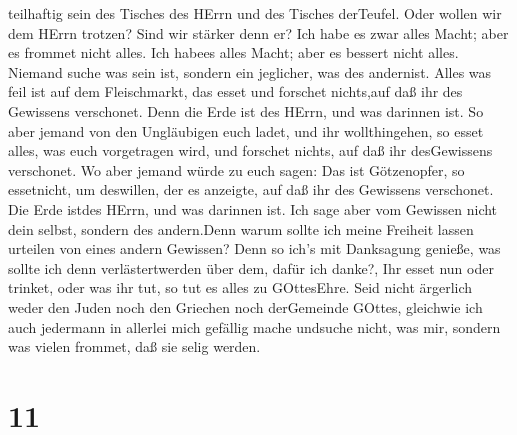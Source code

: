 teilhaftig sein des Tisches des HErrn und des Tisches derTeufel.
 Oder wollen wir dem HErrn trotzen? Sind wir stärker denn
er?  Ich habe es zwar alles Macht; aber es frommet nicht
alles. Ich habees alles Macht; aber es bessert nicht alles.
 Niemand suche was sein ist, sondern ein jeglicher, was des
andernist.  Alles was feil ist auf dem Fleischmarkt, das
esset und forschet nichts,auf daß ihr des Gewissens verschonet.
 Denn die Erde ist des HErrn, und was darinnen ist.
 So aber jemand von den Ungläubigen euch ladet, und ihr
wollthingehen, so esset alles, was euch vorgetragen wird, und forschet
nichts, auf daß ihr desGewissens verschonet.  Wo aber
jemand würde zu euch sagen: Das ist Götzenopfer, so essetnicht, um
deswillen, der es anzeigte, auf daß ihr des Gewissens verschonet. Die
Erde istdes HErrn, und was darinnen ist.  Ich sage aber vom
Gewissen nicht dein selbst, sondern des andern.Denn warum sollte ich
meine Freiheit lassen urteilen von eines andern Gewissen? 
Denn so ich's mit Danksagung genieße, was sollte ich denn
verlästertwerden über dem, dafür ich danke?,  Ihr esset nun
oder trinket, oder was ihr tut, so tut es alles zu GOttesEhre.
 Seid nicht ärgerlich weder den Juden noch den Griechen
noch derGemeinde GOttes,  gleichwie ich auch jedermann in
allerlei mich gefällig mache undsuche nicht, was mir, sondern was vielen
frommet, daß sie selig werden.

\hypertarget{section-10}{%
\section{11}\label{section-10}}

